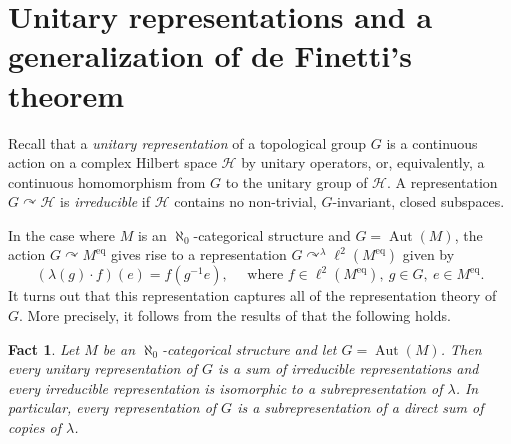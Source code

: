 \documentclass[11pt]{article}
\let\mathcal\mathscr
\let\actson\curvearrowright
\theoremstyle{plain}
\newtheorem{fact}[theorem]{Fact}
\theoremstyle{definition}
\newcommand{\cH}{\mathcal{H}}
\DeclareMathOperator{\Aut}{Aut}
\newcommand{\eq}{^{\mathrm{eq}}}
\begin{document}
\section{Unitary representations and a generalization of de Finetti's theorem}
\label{sec:general-de-finett}

Recall that a \emph{unitary representation} of a topological group $G$ is a continuous action on a complex Hilbert space $\cH$ by unitary operators, or, equivalently, a continuous homomorphism from $G$ to the unitary group of $\cH$. A representation $G \actson \cH$ is \emph{irreducible} if $\cH$ contains no non-trivial, $G$-invariant, closed subspaces.

In the case where $M$ is an $\aleph_0$-categorical structure and $G = \Aut(M)$, the action $G \actson M\eq$ gives rise to a representation $G \actson^\lambda \ell^2(M\eq)$ given by
\begin{equation*}
(\lambda(g) \cdot f)(e) = f(g^{-1} e), \quad \text{ where } f \in \ell^2(M\eq),\ g \in G,\ e \in M\eq.
\end{equation*}
It turns out that this representation captures all of the representation theory of $G$. More precisely, it follows from the results of \cite{Tsankov2012} that the following holds.
\begin{fact}
\label{f:representations}
Let $M$ be an $\aleph_0$-categorical structure and let $G = \Aut(M)$. Then every unitary representation of $G$ is a sum of irreducible representations and every irreducible representation is isomorphic to a subrepresentation of $\lambda$. In particular, every representation of $G$ is a subrepresentation of a direct sum of copies of $\lambda$.
\end{fact}
\end{document}
